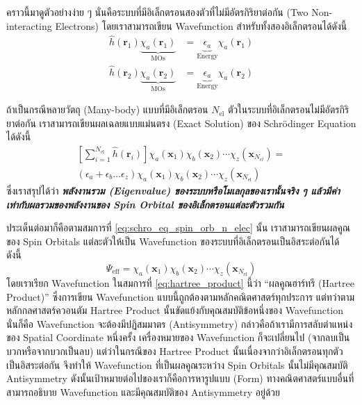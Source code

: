 คราวนี้มาดูตัวอย่างง่าย ๆ นั่นคือระบบที่มีอิเล็กตรอนสองตัวที่ไม่มีอัตรกิริยาต่อกัน (Two Non-interacting Electrons) โดยเราสามารถเขียน Wavefunction สำหรับทั้งสองอิเล็กตรอนได้ดังนี้
%
\begin{align}\label{eq:hamil_spin_orb_two_elec}
    \hat{h}(\bm{r}_{1}) \underbrace{\chi_{a}(\bm{r}_{1})}_{\text{MOs}} & =
    \underbrace{\epsilon_{a}}_{\text{Energy}} \chi_{a}(\bm{r}_{1})         \\
    \hat{h}(\bm{r}_{2}) \underbrace{\chi_{a}(\bm{r}_{2})}_{\text{MOs}} & =
    \underbrace{\epsilon_{a}}_{\text{Energy}} \chi_{a}(\bm{r}_{2})
\end{align}

ถ้าเป็นกรณีหลายวัตถุ (Many-body) แบบที่มีอิเล็กตรอน $N_{\text{el}}$ ตัวในระบบที่อิเล็กตรอนไม่มีอัตรกิริยาต่อกัน เราสามารถเขียนผลเฉลยแบบแม่นตรง (Exact Solution) ของ Schr\"{o}dinger Equation ได้ดังนี้
%
\begin{multline}\label{eq:schro_eq_spin_orb_n_elec}
    \left [ \sum_{i=1}^{N_{\text{el}}} \hat{h}(\bm{r}_{i}) \right ] \chi_{a}(\bm{x}_{1}) \chi_{b}(\bm{x}_{2})
    \cdots \chi_{z}(\bm{x}_{N_{el}}) = \\
    (\epsilon_{a} + \epsilon_{b} \dots \epsilon_{z}) \chi_{a}(\bm{x}_{1}) \chi_{b}(\bm{x}_{2}) \cdots
    \chi_{z}(\bm{x}_{N_{\text{el}}})
\end{multline}
%
\noindent ซึ่งเราสรุปได้ว่า \textbf{\textit{พลังงานรวม (Eigenvalue) ของระบบหรือโมเลกุลของเรานั้นจริง ๆ แล้วมีค่าเท่ากับผลรวมของพลังงานของ Spin Orbital ของอิเล็กตรอนแต่ละตัวรวมกัน}}

ประเด็นต่อมาก็คือตามสมการที่ \eqref{eq:schro_eq_spin_orb_n_elec} นั้น เราสามารถเขียนผลคูณของ Spin Orbitals แต่ละตัวให้เป็น Wavefunction ของระบบที่อิเล็กตรอนเป็นอิสระต่อกันได้ ดังนี้
%
\begin{equation}\label{eq:hartree_product}
    \Psi_{\text{eff}} = \chi_{a}(\bm{x}_{1}) \chi_{b}(\bm{x}_{2}) \cdots \chi_{z}(\bm{x}_{N_{\text{el}}})
\end{equation}
%
\noindent โดยเราเรียก Wavefunction ในสมการที่ \eqref{eq:hartree_product} นี้ว่า \enquote{ผลคูณฮาร์ทรี (Hartree Product)} ซึ่งการเขียน Wavefunction แบบนี้ถูกต้องตามหลักคณิตศาสตร์ทุกประการ แต่ทว่าตามหลักกลศาสตร์ควอนตัม Hartree Product นั้นขัดแย้งกับคุณสมบัติข้อหนึ่งของ Wavefunction นั่นก็คือ Wavefunction จะต้องมีปฏิสมมาตร (Antisymmetry) กล่าวคือถ้าเรามีการสลับตำแหน่งของ Spatial Coordinate หนึ่งครั้ง เครื่องหมายของ Wavefunction ก็จะเปลี่ยนไป (จากลบเป็นบวกหรือจากบวกเป็นลบ) แต่ว่าในกรณีของ Hartree Product นั้นเนื่องจากว่าอิเล็กตรอนทุกตัวเป็นอิสระต่อกัน จึงทำให้ Wavefunction ที่เป็นผลคูณระหว่าง Spin Orbitals นั้นไม่มีคุณสมบัติ Antisymmetry ดังนั้นเป้าหมายต่อไปของเราก็คือการหารูปแบบ (Form) ทางคณิตศาสตร์แบบอื่นที่สามารถอธิบาย Wavefunction และมีคุณสมบัติของ Antisymmetry อยู่ด้วย

